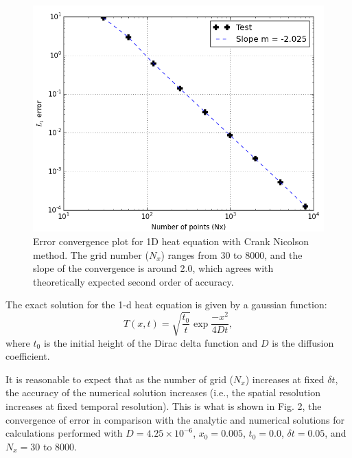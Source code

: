 \documentclass[12pt]{article}		%
\begin{document}
\begin{figure}[h]
\includegraphics[scale=0.4]{figure-3_conv.png}
\caption{Error convergence plot for 1D heat equation with Crank Nicolson method. The grid number ($N_x$) ranges from $30$ to $8000$, and the slope of the convergence is around 2.0, which agrees with theoretically expected second order of accuracy.}
\end{figure}
The exact solution for the 1-d heat equation is given by a gaussian function:
\[
	T(x,t) = \sqrt{\frac{t_0}{t}} \exp{\frac{-x^2}{4 D t}},
\]
where $t_0$ is the initial height of the Dirac delta function and $D$ is the diffusion coefficient.

It is reasonable to expect that as the number of grid ($N_x$) increases at fixed $\delta t$, the accuracy of the numerical solution increases (i.e., the spatial resolution increases at fixed temporal resolution). This is what is shown in Fig. 2, the convergence of error in comparison with the analytic and numerical solutions for calculations performed with $D=4.25\times 10^{-6}$, $x_0 = 0.005$, $t_0=0.0$, $\delta t = 0.05$, and $N_x = 30$ to 8000. 


\newpage
\end{document}
